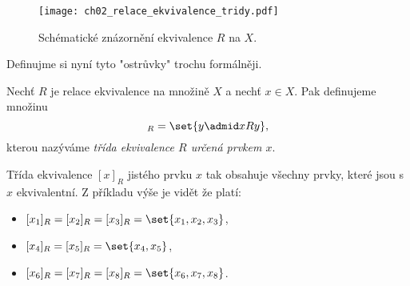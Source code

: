 \begin{figure}[H]
    \centering
    \texttt{[image: ch02\_relace\_ekvivalence\_tridy.pdf]}
    \caption{Schématické znázornění ekvivalence $R$ na $X$.}
    \label{fig:relace_ekvivalence_tridy}
\end{figure}
Definujme si nyní tyto "ostrůvky" trochu formálněji.
\begin{definition}
    Nechť $R$ je relace ekvivalence na množině $X$ a nechť $x\in X$. Pak definujeme množinu
    \begin{equation*}
        [x]_R=\set{y \admid xRy},
    \end{equation*}
    kterou nazýváme \emph{třída ekvivalence $R$ určená prvkem $x$}.
\end{definition}
Třída ekvivalence $[x]_R$ jistého prvku $x$ tak obsahuje všechny prvky, které jsou s $x$ ekvivalentní. Z příkladu výše je vidět že platí:
\begin{itemize}
    \item $[x_1]_R=[x_2]_R=[x_3]_R=\set{x_1,x_2,x_3}$,
    \item $[x_4]_R=[x_5]_R=\set{x_4,x_5}$,
    \item $[x_6]_R=[x_7]_R=[x_8]_R=\set{x_6,x_7,x_8}$.
\end{itemize}
